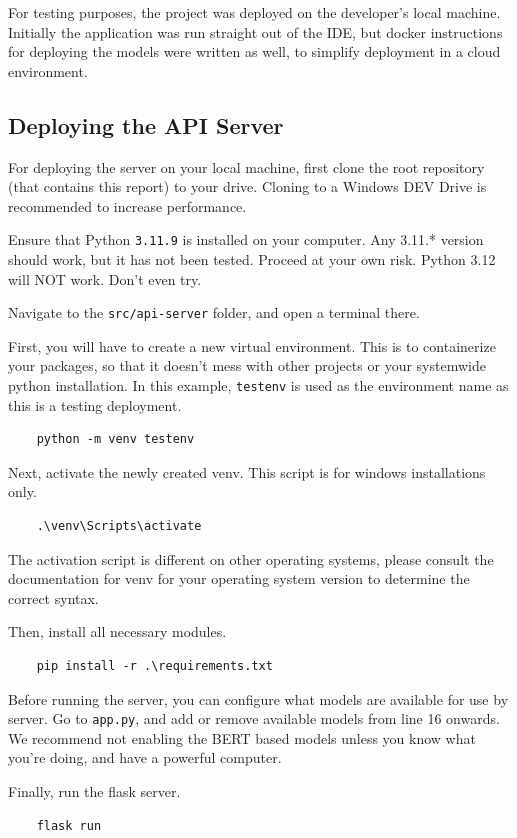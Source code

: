 For testing purposes, the project was deployed on the developer's local machine. Initially the application was run straight out of the IDE, but docker instructions for deploying the models were written as well, to simplify deployment in a cloud environment.

\subsection{Deploying the API Server}

For deploying the server on your local machine, first clone the root repository (that contains this report) to your drive. Cloning to a Windows DEV Drive is recommended to increase performance.

Ensure that Python \texttt{3.11.9} is installed on your computer. Any 3.11.* version should work, but it has not been tested. Proceed at your own risk. Python 3.12 will NOT work. Don't even try.

Navigate to the \texttt{src/api-server} folder, and open a terminal there.

First, you will have to create a new virtual environment. This is to containerize your packages, so that it doesn't mess with other projects or your systemwide python installation. In this example, \texttt{testenv} is used as the environment name as this is a testing deployment.
\begin{verbatim}
    python -m venv testenv
\end{verbatim}

Next, activate the newly created venv. This script is for windows installations only.
\begin{verbatim}
    .\venv\Scripts\activate
\end{verbatim}
The activation script is different on other operating systems, please consult the documentation for venv for your operating system version to determine the correct syntax.

Then, install all necessary modules.
\begin{verbatim}
    pip install -r .\requirements.txt
\end{verbatim}

Before running the server, you can configure what models are available for use by server. Go to \texttt{app.py}, and add or remove available models from line 16 onwards. We recommend not enabling the BERT based models unless you know what you're doing, and have a powerful computer.

Finally, run the flask server.
\begin{verbatim}
    flask run
\end{verbatim}

